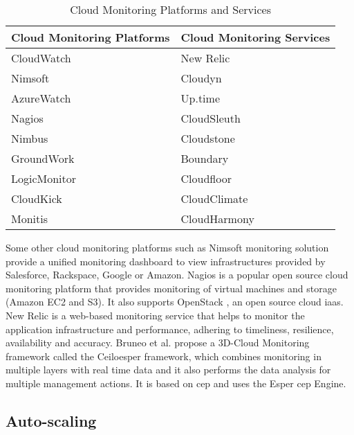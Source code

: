 \documentclass[article,type=msc,colorback,12pt,accentcolor=tud8b,table]{tudthesis}
\begin{document}
\begin{table}[h!]
  \centering
  \caption{Cloud Monitoring Platforms and Services }
  \label{tab:Table1}
  \begin{tabular}{l|l}
  \hline
  \rowcolor[HTML]{FFD27F}  \textbf{Cloud Monitoring Platforms}  & \textbf{Cloud Monitoring Services} \\
    \hline
    CloudWatch \cite{cloudwatchdev} \cite{cloudwatch} & New Relic \cite{newrelic} \\    
    Nimsoft \cite{nimsoft} & Cloudyn \cite{cloudyn} \\        
    AzureWatch \cite{azurewatch} & Up.time \cite{uptime} \\        
    Nagios \cite{nagios} & CloudSleuth \cite{cloudsleuth} \\
    Nimbus \cite{nimbus} & Cloudstone \cite{cloudstone} \\ 
    GroundWork \cite{groundwork} & Boundary \cite{boundary} \\
    LogicMonitor \cite{logicmonitor} & Cloudfloor \cite{cloudfloor} \\ 
    CloudKick \cite{cloudkick} & CloudClimate \cite{cloudclimate} \\    
    Monitis \cite{monitis} & CloudHarmony \cite{cloudharmony} \\
    \hline
    
  \end{tabular}
\end{table}
	
	Some other cloud monitoring platforms such as Nimsoft monitoring solution \cite{nimsoft} provide a unified monitoring dashboard to view infrastructures provided by Salesforce, Rackspace, Google or Amazon. Nagios \cite{nagios} is a popular open source cloud monitoring platform that provides monitoring of virtual machines and storage (Amazon EC2 and S3). It also supports OpenStack \cite{openstack}, an open source cloud \gls{iaas}. New Relic \cite{newrelic} is a web-based monitoring service that helps to monitor the application infrastructure and performance, adhering to timeliness, resilience, availability and accuracy. Bruneo et al. \cite{bruneo2015framework} propose a 3D-Cloud Monitoring framework called the Ceiloesper framework, which combines monitoring in multiple layers with real time data and it also performs the data analysis for multiple management actions. It is based on \gls{cep} and uses the Esper \gls{cep} Engine.	
	
	\subsection{Auto-scaling}	
	
\end{document}
